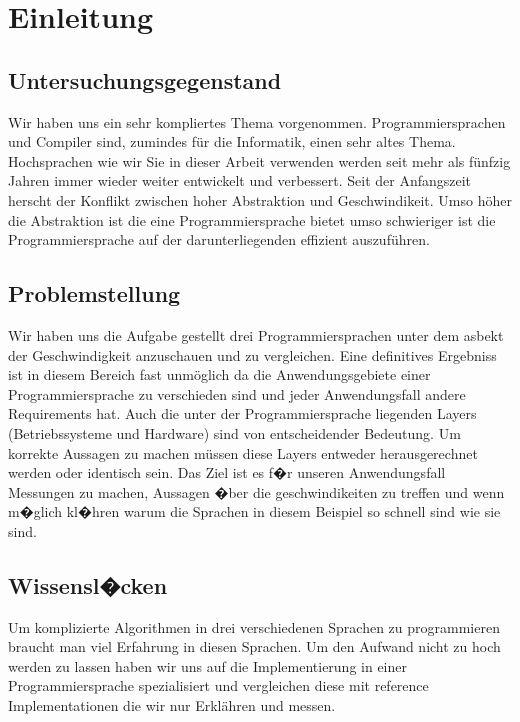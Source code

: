 \documentclass{fancydocument}
\begin{document}
\section{Einleitung}

\subsection{Untersuchungsgegenstand}
Wir haben uns ein sehr kompliertes Thema
vorgenommen. Programmiersprachen und Compiler sind, zumindes f\"ur die
Informatik, einen sehr altes Thema. \\

Hochsprachen wie wir Sie in dieser Arbeit verwenden werden seit mehr
als f\"unfzig Jahren immer wieder weiter entwickelt und verbessert. Seit
der Anfangszeit herscht der Konflikt zwischen hoher Abstraktion und
Geschwindikeit. Umso h\"oher die Abstraktion ist die eine
Programmiersprache bietet umso schwieriger ist die Programmiersprache
auf der darunterliegenden effizient auszuf\"uhren. 

\subsection{Problemstellung}

Wir haben uns die Aufgabe gestellt drei Programmiersprachen unter dem
asbekt der Geschwindigkeit anzuschauen und zu vergleichen. Eine
definitives Ergebniss ist in diesem Bereich fast unm\"oglich da die
Anwendungsgebiete einer Programmiersprache zu verschieden sind und
jeder Anwendungsfall andere Requirements hat. Auch die
unter der Programmiersprache liegenden Layers (Betriebssysteme und
Hardware) sind von entscheidender Bedeutung. Um korrekte Aussagen zu
machen m\"ussen diese Layers entweder herausgerechnet werden oder
identisch sein. Das Ziel ist es f�r unseren Anwendungsfall Messungen
zu machen, Aussagen �ber die geschwindikeiten zu treffen und
wenn m�glich kl�hren warum die Sprachen in diesem Beispiel so schnell
sind wie sie sind.

\subsection{Wissensl�cken}

Um komplizierte Algorithmen in drei verschiedenen Sprachen zu
programmieren braucht man viel Erfahrung in diesen Sprachen. Um den
Aufwand nicht zu hoch werden zu lassen haben wir uns auf die
Implementierung in einer Programmiersprache spezialisiert und
vergleichen diese mit reference Implementationen die wir nur Erkl\"ahren
und messen.
\end{document}
